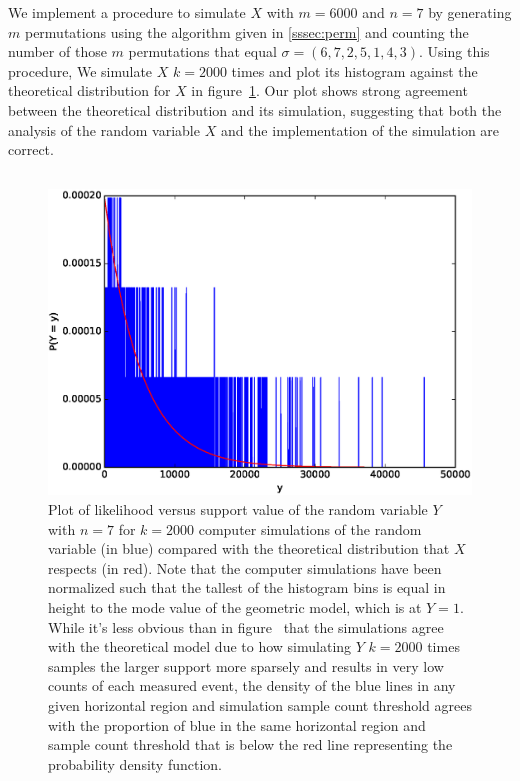 \documentclass[11pt, oneside]{article}   	%
\begin{document}
We implement a procedure to simulate $X$ with $m = 6000$ and $n = 7$ by generating $m$ permutations using the algorithm given in \ref{sssec:perm} and counting the number of those $m$ permutations that equal $\sigma = (6, 7, 2, 5, 1, 4, 3)$. Using this procedure, We simulate $X$ $k = 2000$ times and plot its histogram against the theoretical distribution for $X$ in figure~\ref{fig:x}. Our plot shows strong agreement between the theoretical distribution and its simulation, suggesting that both the analysis of the random variable $X$ and the implementation of the simulation are correct.

\subsection{}

\begin{figure}\label{fig:y}
\includegraphics[scale=.5]{part_1_problem_5}
\caption{Plot of likelihood versus support value of the random variable $Y$ with $n = 7$ for $k = 2000$ computer simulations of the random variable (in blue) compared with the theoretical distribution that $X$ respects (in red). Note that the computer simulations have been normalized such that the tallest of the histogram bins is equal in height to the mode value of the geometric model, which is at $Y = 1$. While it's less obvious than in figure~\label{fig:x} that the simulations agree with the theoretical model due to how simulating $Y$ $k = 2000$ times samples the larger support more sparsely and results in very low counts of each measured event, the density of the blue lines in any given horizontal region and simulation sample count threshold agrees with the proportion of blue in the same horizontal region and sample count threshold that is below the red line representing the probability density function.}
\end{figure}
\end{document}
